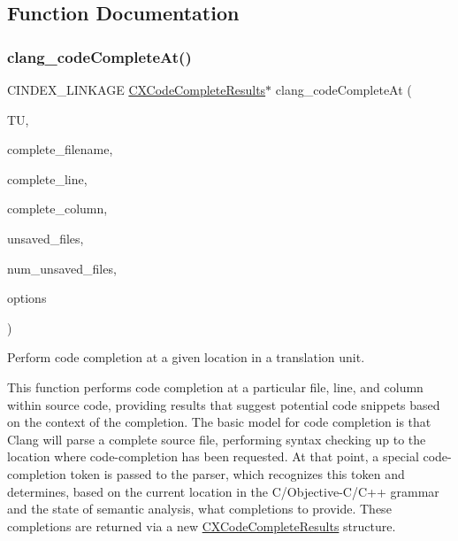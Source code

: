 \subsection{Function Documentation}
\mbox{\label{group__CINDEX__CODE__COMPLET_ga50fedfa85d8d1517363952f2e10aa3bf}} 
\subsubsection{\texorpdfstring{clang\+\_\+code\+Complete\+At()}{clang\_codeCompleteAt()}}
{\footnotesize\ttfamily C\+I\+N\+D\+E\+X\+\_\+\+L\+I\+N\+K\+A\+GE \hyperlink{structCXCodeCompleteResults}{C\+X\+Code\+Complete\+Results}$\ast$ clang\+\_\+code\+Complete\+At (\begin{DoxyParamCaption}\item[{\hyperlink{group__CINDEX_gacdb7815736ca709ce9a5e1ec2b7e16ac}{C\+X\+Translation\+Unit}}]{TU,  }\item[{const char $\ast$}]{complete\+\_\+filename,  }\item[{unsigned}]{complete\+\_\+line,  }\item[{unsigned}]{complete\+\_\+column,  }\item[{struct \hyperlink{structCXUnsavedFile}{C\+X\+Unsaved\+File} $\ast$}]{unsaved\+\_\+files,  }\item[{unsigned}]{num\+\_\+unsaved\+\_\+files,  }\item[{unsigned}]{options }\end{DoxyParamCaption})}



Perform code completion at a given location in a translation unit. 

This function performs code completion at a particular file, line, and column within source code, providing results that suggest potential code snippets based on the context of the completion. The basic model for code completion is that Clang will parse a complete source file, performing syntax checking up to the location where code-\/completion has been requested. At that point, a special code-\/completion token is passed to the parser, which recognizes this token and determines, based on the current location in the C/\+Objective-\/\+C/\+C++ grammar and the state of semantic analysis, what completions to provide. These completions are returned via a new {\ttfamily \hyperlink{structCXCodeCompleteResults}{C\+X\+Code\+Complete\+Results}} structure.

